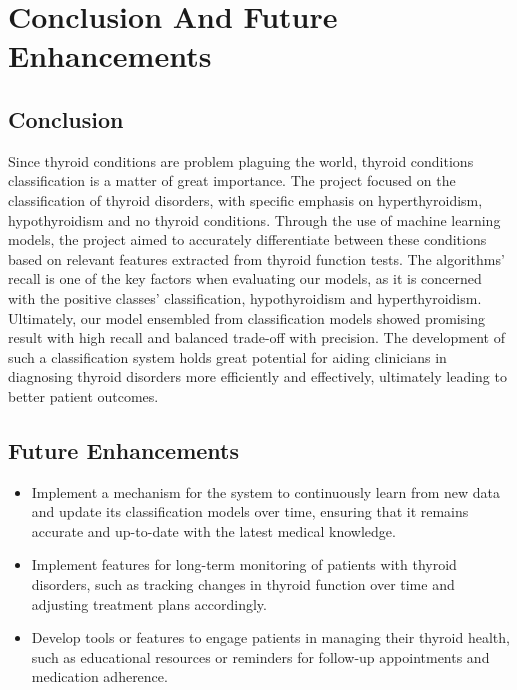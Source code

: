 \chapter{Conclusion And Future Enhancements}
\section{Conclusion}
Since thyroid conditions are problem plaguing the world, thyroid conditions classification is a matter of great importance. 
The project focused on the classification of thyroid disorders, with specific emphasis on hyperthyroidism, hypothyroidism and no thyroid conditions. Through the use of machine learning models, the project aimed to accurately differentiate between these conditions based on relevant features extracted from thyroid function tests. The algorithms' recall is one of the key factors when evaluating our models, as it is concerned with the positive classes' classification, hypothyroidism and hyperthyroidism. Ultimately, our model ensembled from classification models showed promising result with high recall and balanced trade-off with precision. The development of such a classification system holds great potential for aiding clinicians in diagnosing thyroid disorders more efficiently and effectively, ultimately leading to better patient outcomes.
\section{Future Enhancements}
\begin{itemize}
\item Implement a mechanism for the system to continuously learn from new data and update its classification models over time, ensuring that it remains accurate and up-to-date with the latest medical knowledge.
\item Implement features for long-term monitoring of patients with thyroid disorders, such as tracking changes in thyroid function over time and adjusting treatment plans accordingly.
\item Develop tools or features to engage patients in managing their thyroid health, such as educational resources or reminders for follow-up appointments and medication adherence.
\end{itemize}
\newpage

